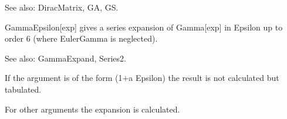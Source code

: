 See also:  DiracMatrix, GA, GS.



\dispSFoutmath{
\mu 
}

\dispSFinmath{
\nu 
}


\dispSFinmath{
{{\gamma }^{\mu }}
}










GammaEpsilon[exp] gives a series expansion of Gamma[exp] in Epsilon up to order 6 (where EulerGamma is neglected).

See also:  GammaExpand, Series2.


If the argument is of the form (1\(+\)a Epsilon) the result is not calculated but tabulated.





For other arguments the expansion is calculated.

